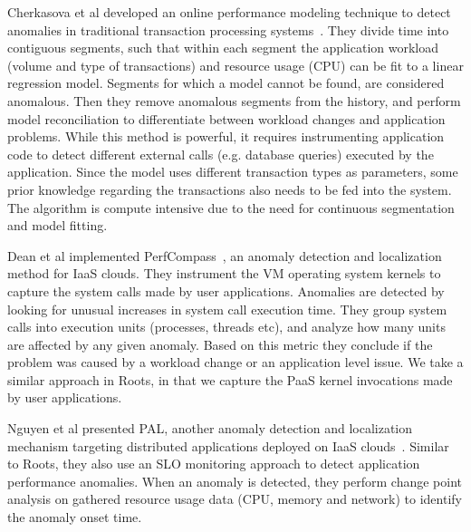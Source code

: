 Cherkasova et al developed an online
performance modeling technique to detect anomalies in traditional transaction processing systems~\cite{4630116}. 
They divide time into contiguous segments, such that within each
segment the application workload (volume and type of transactions) and resource usage (CPU) can be 
fit to a linear regression model.
Segments for which a model cannot be found, are considered anomalous. Then they remove anomalous segments
from the history, and perform model reconciliation to differentiate between workload changes and application problems. 
While this method is powerful, it
requires instrumenting application code to detect different external calls (e.g. database queries) executed by the application. 
Since the model uses different transaction types as parameters, 
some prior knowledge regarding the transactions also needs to be fed into the system. 
The algorithm is compute intensive due to the need for continuous segmentation and model fitting.

Dean et al implemented PerfCompass~\cite{Dean:2014:PTR:2696535.2696551}, 
an anomaly detection and localization method for IaaS clouds. They instrument
the VM operating system kernels to capture the system calls made by user applications. Anomalies are detected by
looking for unusual increases in system call execution time. They group system calls into execution units
(processes, threads etc), and analyze how many units are affected by any given anomaly. 
Based on this metric they conclude if the problem was caused by a workload change or an application
level issue. We take a similar approach in Roots, in that we capture the PaaS kernel invocations
made by user applications. 

Nguyen et al presented PAL, another anomaly detection and localization mechanism targeting
distributed applications deployed on IaaS clouds~\cite{Nguyen:2011:PPR:2038633.2038634}. 
Similar to Roots, they also use an SLO monitoring approach to detect application
performance anomalies. When an anomaly is detected, they perform change point analysis
on gathered resource usage data (CPU, memory and network) to identify the anomaly onset time.

